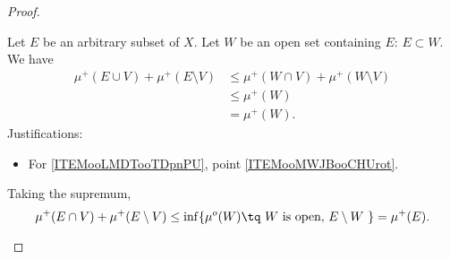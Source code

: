\begin{proof}
\begin{subproof}
                \label{ITEMooHQPDooPEsgYN}
        
           Let \( E\) be an arbitrary subset of \( X\). Let \( W\) be an open set containing \( E\): \( E\subset W\). We have
           \begin{subequations}
               \begin{align}
                   \mu^+(E\cup V)+\mu^+(E\setminus V)&\leq \mu^+(W\cap V)+\mu^+(W\setminus V)\\
                   &\leq \mu^+(W)   \label{ITEMooLMDTooTDpnPU}\\
                   &=\mu^+(W).
               \end{align}
           \end{subequations}
           Justifications:
           \begin{itemize}
               \item For \eqref{ITEMooLMDTooTDpnPU}, point \ref{ITEMooMWJBooCHUrot}.
           \end{itemize}
            Taking the supremum,
            \begin{equation}
                \mu^+(E\cap V)+\mu^+(E\setminus V)\leq\inf\{ \mu^o(W)\tq \text{ \( W\) is open, \( E\setminus W\) } \}=\mu^+(E).
            \end{equation}
            
                    \label{ITEMooTWGLooHVvkUW}


\end{subproof}
\end{proof}
